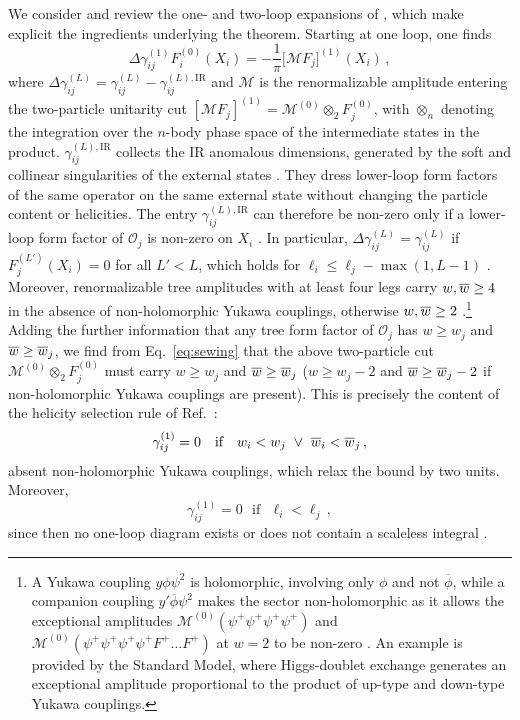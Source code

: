 We consider and review the one- and two-loop expansions of , which make explicit the
ingredients underlying the theorem. Starting at one loop, one finds \cite{Caron-Huot:2016cwu}
\begin{equation}
    \Delta\gamma^{(1)}_{i j}F^{(0)}_i(X_i) = -\frac{1}{\pi}\big[\mathcal M F_j\big]^{(1)}(X_i)\,,
\end{equation}
where $\Delta\gamma_{i j}^{(L)} = \gamma_{i j}^{(L)} - \gamma_{ij}^{(L),\mathrm{IR}}$ and $\mathcal M$ is the renormalizable amplitude entering the two-particle unitarity cut $[\mathcal M F_j]^{(1)} = \mathcal M^{(0)} \otimes_2  F_j^{(0)}$,
with $\otimes_n$ denoting the integration over the $n$-body phase space of the intermediate states in the product.
$\gamma_{ij}^{(L),\mathrm{IR}}$ collects the IR anomalous dimensions, generated by the soft and collinear singularities of the external states \cite{Sterman:2002qn,Becher:2009cu,Chiu:2009mg}. They dress lower-loop form factors of the same operator on the same external state without changing the particle content or helicities.
The entry $\gamma^{(L),\text{IR}}_{ij}$ can therefore be non-zero only if a lower-loop form factor of $\mathcal O_j$ is non-zero on $X_i$ \cite{Catani:1998bh}. In particular, $\Delta\gamma_{ij}^{(L)} = \gamma_{ij}^{(L)}$ if $F^{(L')}_j(X_i)=0$ for all $L'<L$, which holds for $\ell_i \le \ell_j - \max(1,L-1)$ \cite{Bern:2019wie}.
Moreover, renormalizable tree amplitudes with at least four legs carry $w,\overline{w} \ge 4$ in the absence of non-holomorphic Yukawa couplings, otherwise $w,\overline{w} \ge 2$ \cite{Cheung:2015aba}.\footnote{A Yukawa coupling $y\phi\psi^2$ is holomorphic, involving only $\phi$ and not $\overline\phi$, while a companion coupling $y'\overline\phi\psi^2$ makes the sector non-holomorphic as it allows the exceptional amplitudes $\mathcal M^{(0)}(\psi^+\psi^+\psi^+\psi^+)$ and $\mathcal M^{(0)}(\psi^+\psi^+\psi^+\psi^+ F^+ \dots F^+)$ at $w=2$ to be non-zero \cite{Cheung:2015aba}.
An example is provided by the Standard Model, where Higgs-doublet exchange generates an exceptional amplitude proportional to the product of up-type and down-type Yukawa couplings.}
Adding the further information that any tree form factor of $\mathcal O_j$ has $w \ge w_j$ and $\overline{w} \ge \overline{w}_j$, we find from Eq.~\eqref{eq:sewing} that the above two-particle cut $\mathcal M^{(0)} \otimes_2  F_j^{(0)}$ must carry $w\ge w_j$ and $\overline{w}\ge \overline{w}_j$ ($w\ge w_j-2$ and $\overline{w}\ge \overline{w}_j-2$ if non-holomorphic Yukawa couplings are present).
This is precisely the content of the helicity selection rule of Ref.~\cite{Cheung:2015aba}:
\begin{equation}
    \gamma_{ij}^{(1)} = 0 \ \ \ \text{if} \ \ \ w_i < w_j \ \lor  \ \overline{w}_i < \overline{w}_j\,,
    \label{eq:1lhsr}
\end{equation}
absent non-holomorphic Yukawa couplings, which relax the bound by two units.
Moreover,
\begin{equation}
    \gamma_{ij}^{(1)} = 0 \ \ \ \text{if} \ \ \  \ell_i < \ell_j\,,
\end{equation}
since then no one-loop diagram exists or does not contain a scaleless integral \cite{Bern:2019wie}.

